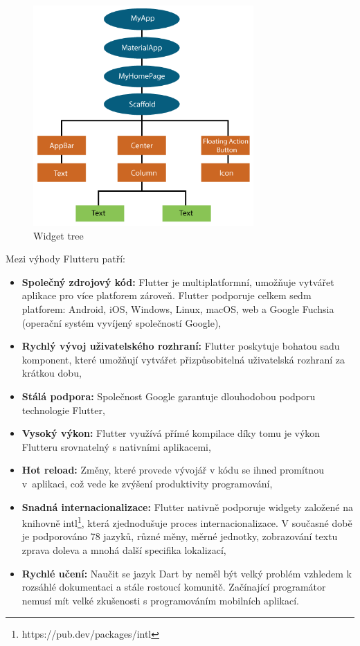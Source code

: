 \documentclass[czech, bc, kiv, he, iso690numb]{fasthesis}
\begin{document}
\begin{figure}[h!]
  \centering
  \includegraphics[width=0.75\textwidth]{img/BP-Runt/Technologies/flutter-widget-tree.png}
  \caption{Widget tree \cite{flutter-widget-tree}}
  \label{fig:flutter_widget_tree}
\end{figure}

\noindent Mezi výhody Flutteru patří: \cite{pros-and-cons-flutter} \cite{AltexSoft_2022}
\begin{itemize}
    \itemsep0em
    \item \textbf{Společný zdrojový kód:} Flutter je multiplatformní, umožňuje vytvářet aplikace pro více platforem zároveň. Flutter podporuje celkem sedm platforem: Android, iOS, Windows, Linux, macOS, web a Google Fuchsia (operační systém vyvíjený společností Google),
    \item \textbf{Rychlý vývoj uživatelského rozhraní:} Flutter poskytuje bohatou sadu komponent, které umožňují vytvářet přizpůsobitelná uživatelská rozhraní za krátkou dobu,
    \item \textbf{Stálá podpora:} Společnost Google garantuje dlouhodobou podporu technologie Flutter,
    \item \textbf{Vysoký výkon:} Flutter využívá přímé kompilace díky tomu je výkon Flutteru srovnatelný s nativními aplikacemi,
    \item \textbf{Hot reload:} Změny, které provede vývojář v kódu se ihned promítnou v~aplikaci, což vede ke zvýšení produktivity programování,
    \item \textbf{Snadná internacionalizace:} Flutter nativně podporuje widgety založené na knihovně intl\footnote{https://pub.dev/packages/intl}, která zjednodušuje proces internacionalizace. V současné době je podporováno 78 jazyků, různé měny, měrné jednotky, zobrazování textu zprava doleva a mnohá další specifika lokalizací,
     \item \textbf{Rychlé učení:} Naučit se jazyk Dart by neměl být velký problém vzhledem k rozsáhlé dokumentaci a stále rostoucí komunitě. Začínající programátor nemusí mít velké zkušenosti s programováním mobilních aplikací.
\end{itemize}
\end{document}
